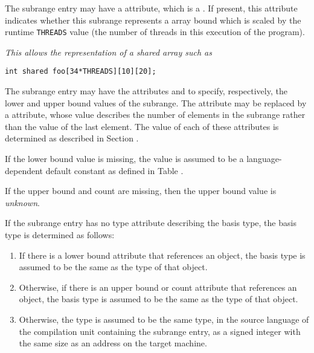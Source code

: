 The 
\hypertarget{chap:DWATthreadsscaledupcarrayboundthreadsscalfactor}{}
subrange entry may have a 
\DWATthreadsscaledDEFN{} attribute,
which is a . 
If present, this attribute indicates whether
this subrange represents a  array bound which is scaled
by the runtime \texttt{THREADS} value (the number of  threads in
this execution of the program).

\textit{This allows the representation of a  shared array such as}

\begin{lstlisting}[numbers=none]
int shared foo[34*THREADS][10][20];
\end{lstlisting}

The 
\hypertarget{chap:DWATlowerboundlowerboundofsubrange}{}
subrange 
\hypertarget{chap:DWATupperboundupperboundofsubrange}{}
entry may have the attributes 
\DWATlowerboundDEFN{}
and \DWATupperboundDEFN{}
 to specify, respectively, the lower
and upper bound values of the subrange. The 
\DWATupperboundNAME{} attribute 
\hypertarget{chap:DWATcountelementsofsubrangetype}{}
may be replaced by a
\DWATcountDEFN{} attribute, 
whose value describes the number of elements in the subrange 
rather than the value of the last element. The value of each 
of these attributes is determined as described in 
Section .

If the lower bound value is missing, the value is assumed to
be a language-dependent default constant as defined in
Table .

If the upper bound and count are missing, then the upper bound value is 
\textit{unknown}.

If the subrange entry has no type attribute describing the
basis type, the basis type is determined as follows:
\begin{enumerate}[1. ]
\item
If there is a lower bound attribute that references an object,
the basis type is assumed to be the same as the type of that object.
\item
Otherwise, if there is an upper bound or count attribute that references
an object, the basis type is assumed to be the same as the type of that object.
\item
Otherwise, the type is
assumed to be the same type, in the source language of the
compilation unit containing the subrange entry, as a signed
integer with the same size as an address on the target machine.
\end{enumerate}

